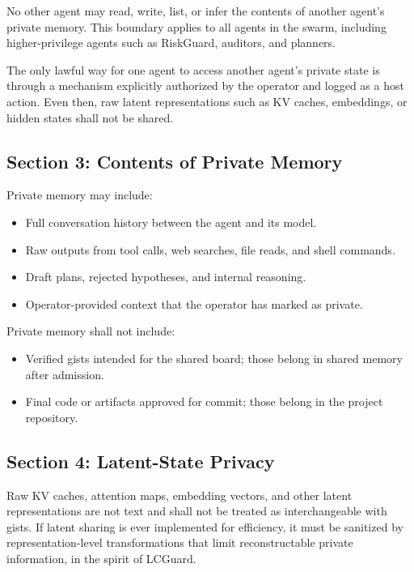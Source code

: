 \documentclass[12pt,letterpaper]{article}
\begin{document}
\begin{warningbox}
No other agent may read, write, list, or infer the contents of another agent's private memory. This boundary applies to all agents in the swarm, including higher-privilege agents such as RiskGuard, auditors, and planners.
\end{warningbox}

The only lawful way for one agent to access another agent's private state is through a mechanism explicitly authorized by the operator and logged as a host action. Even then, raw latent representations such as KV caches, embeddings, or hidden states shall not be shared.

\subsection{Section 3: Contents of Private Memory}

Private memory may include:

\begin{itemize}
    \item Full conversation history between the agent and its model.
    \item Raw outputs from tool calls, web searches, file reads, and shell commands.
    \item Draft plans, rejected hypotheses, and internal reasoning.
    \item Operator-provided context that the operator has marked as private.
\end{itemize}

Private memory shall not include:

\begin{itemize}
    \item Verified gists intended for the shared board; those belong in shared memory after admission.
    \item Final code or artifacts approved for commit; those belong in the project repository.
\end{itemize}

\subsection{Section 4: Latent-State Privacy}

Raw KV caches, attention maps, embedding vectors, and other latent representations are not text and shall not be treated as interchangeable with gists. If latent sharing is ever implemented for efficiency, it must be sanitized by representation-level transformations that limit reconstructable private information, in the spirit of LCGuard.
\end{document}

